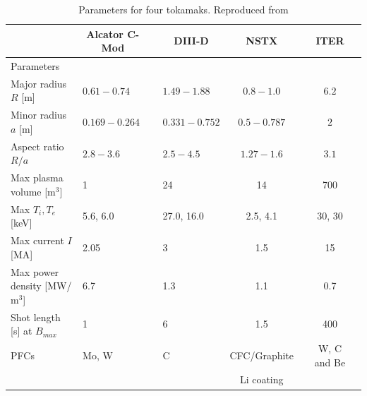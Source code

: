 \documentclass[11pt,titlepage]{report}
\newcommand{\ra}[1]{\renewcommand{\arraystretch}{#1}}
\begin{document}
\begin{table}\centering
\ra{1.4}
\begin{tabular}{@{}llclclcl@{}}\toprule[2 pt]
&\multicolumn{1}{c}{Alcator C-Mod} & \phantom{abc} & \multicolumn{1}{c}{DIII-D} & \multicolumn{1}{c}{NSTX}  && \multicolumn{1}{c}{ITER} &\\
\midrule
\phantom{a}Parameters & &&  \\
\phantom{a}Major radius $R$ [m] 	&	$0.61 - 0.74$	&&	$1.49-1.88$		 & 	$0.8-1.0$	 && 	$6.2$		\\
\phantom{a}Minor radius $a$ [m] 	&	$0.169-0.264$	&& 	$0.331-0.752$	         & 	$0.5-0.787$	 &&     $2$	        \\
\phantom{a}Aspect ratio	$R/a$           &       $2.8-3.6$	&&	$2.5-4.5$        	 & 	$1.27-1.6$	 && 	$3.1$		\\
\phantom{a}Max plasma volume [$\text{m}^3$]	&	1	&&	24			 & 	14        	 && 	700		\\
\phantom{a}Max  $T_i, T_e$ [keV]	&	5.6, 6.0	&&	27.0, 16.0		 & 	2.5, 4.1	 && 	30, 30		\\
\phantom{a}Max current $I$ [MA]         &	2.05	        &&	3			 & 	1.5        	 && 	15		\\
\phantom{a}Max power density [MW/$\text{m}^3$]	& 6.7    	&&	1.3			 & 	1.1	         && 	0.7		\\
\phantom{a}Shot length [s] at $B_{max}$  &	1	        &&	6			 & 	1.5        	 && 	400		\\
\phantom{a}PFCs	                        &	Mo, W	        &&	C			 & 	CFC/Graphite	 && 	W, C and Be	\\
	                                &		        &&				 & 	Li coating	 && 			\\
\bottomrule[2 pt]
\end{tabular}
\caption{Parameters for four tokamaks. Reproduced from \cite{MIT_PSFC08}}
\label{tbl:tokamak_params_juxtaposition}
\end{table}
\end{document}
